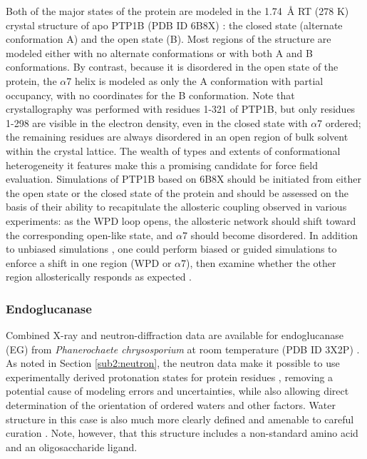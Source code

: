 \documentclass[9pt,review,pubversion]{livecoms}
\begin{document}
Both of the major states of the protein are modeled in the \qty{1.74}{\angstrom} RT (278 K) crystal structure of apo PTP1B (PDB ID 6B8X) \cite{keedy_expanded_2018}: the closed state (alternate conformation A) and the open state (B).
Most regions of the structure are modeled either with no alternate conformations or with both A and B conformations.
By contrast, because it is disordered in the open state of the protein, the $\alpha$7 helix is modeled as only the A conformation with partial occupancy, with no coordinates for the B conformation.
Note that crystallography was performed with residues 1-321 of PTP1B, but only residues 1-298 are visible in the electron density, even in the closed state with $\alpha$7 ordered; the remaining residues are always disordered in an open region of bulk solvent within the crystal lattice.
The wealth of types and extents of conformational heterogeneity it features make this a promising candidate for force field evaluation.
Simulations of PTP1B based on 6B8X should be initiated from either the open state or the closed state of the protein and should be assessed on the basis of their ability to recapitulate the allosteric coupling observed in various experiments: as the WPD loop opens, the allosteric network should shift toward the corresponding open-like state, and $\alpha$7 should become disordered.
In addition to unbiased simulations \cite{yeh_conserved_2023}, one could perform biased or guided simulations to enforce a shift in one region (WPD or $\alpha$7), then examine whether the other region allosterically responds as expected \cite{crean_sequence_2024}.

\subsubsection{Endoglucanase}
\label{sub2:endoglucanase}

Combined X-ray and neutron-diffraction data are available for endoglucanase (EG) from \textit{Phanerochaete chrysosporium} at room temperature (PDB ID 3X2P) \cite{nakamura_newtons_2015}.
As noted in Section \ref{sub2:neutron}, the neutron data make it possible to use experimentally derived protonation states for protein residues \cite{blakeley_neutron_2009,chen_direct_2012,ashkar_neutron_2018}, removing a potential cause of modeling errors and uncertainties, while also allowing direct determination of the orientation of ordered waters and other factors.
Water structure in this case is also much more clearly defined and amenable to careful curation \cite{blakeley_15-k_2004,wall_biomolecular_2019}.
Note, however, that this structure includes a non-standard amino acid and an oligosaccharide ligand.
\end{document}
